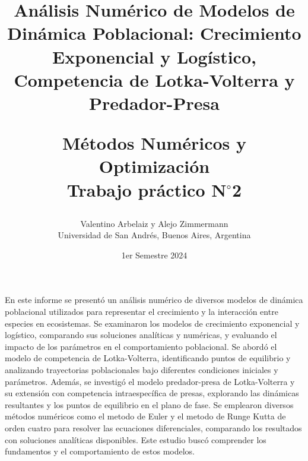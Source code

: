 \documentclass[12pt,a4]{article} %
\title{Análisis Numérico de Modelos de Dinámica Poblacional: Crecimiento Exponencial y Logístico, Competencia de Lotka-Volterra y Predador-Presa\\


\vspace{20mm}

 Métodos Numéricos y Optimización\\
 Trabajo práctico N$^{\circ}$2\\
}
\author{Valentino Arbelaiz y Alejo Zimmermann\\ [2mm] %
\small Universidad de San Andrés, Buenos Aires, Argentina}
\date{1er Semestre 2024}
\begin{document}
\vspace{1cm} %



\maketitle


\begin{abstract}

\vspace{2mm}
\end{abstract}

 En este informe se presentó un análisis numérico de diversos modelos de dinámica poblacional utilizados para representar el crecimiento y la interacción entre especies en ecosistemas. Se examinaron los modelos de crecimiento exponencial y logístico, comparando sus soluciones analíticas y numéricas, y evaluando el impacto de los parámetros en el comportamiento poblacional. Se abordó el modelo de competencia de Lotka-Volterra, identificando puntos de equilibrio y analizando trayectorias poblacionales bajo diferentes condiciones iniciales y parámetros. Además, se investigó el modelo predador-presa de Lotka-Volterra y su extensión con competencia intraespecífica de presas, explorando las dinámicas resultantes y los puntos de equilibrio en el plano de fase. Se emplearon diversos métodos numéricos como el metodo de Euler y el metodo de Runge Kutta de orden cuatro para resolver las ecuaciones diferenciales, comparando los resultados con soluciones analíticas disponibles. Este estudio buscó comprender los fundamentos y el comportamiento de estos modelos.\\
\end{document}

